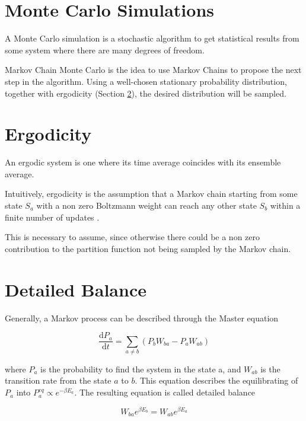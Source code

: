 \section{Monte Carlo Simulations}
\label{sec:MonteCarloSims}


A Monte Carlo simulation is a stochastic algorithm to get statistical results from some system where there are many degrees of freedom.

Markov Chain Monte Carlo is the idea to use Markov Chains to propose the next step in the algorithm. Using a well-chosen stationary probability distribution, together with ergodicity (Section \ref{sec:Ergodicity}), the desired distribution will be sampled.

\section{Ergodicity}
\label{sec:Ergodicity}

An ergodic system is one where its time average coincides with its ensemble average. 

Intuitively, ergodicity is the assumption that a Markov chain starting from some state $S_a$ with a non zero Boltzmann weight can reach any other state $S_b$ within a finite number of updates \cite{Zwanzig:nonequil_stat_mech}.

This is necessary to assume, since otherwise there could be a non zero contribution to the partition function not being sampled by the Markov chain.

\section{Detailed Balance}
\label{sec:DetailedBalance}

Generally, a Markov process can be described through the Master equation

\begin{equation}
    \frac{\mathrm d P_a}{\mathrm d t} = \sum_{a \neq b} \left ( P_b W_{ba} - P_a W_{ab} \right )
\end{equation}

where $P_a$ is the probability to find the system in the state a, and $W_{ab}$ is the transition rate from the state $a$ to $b$. This equation describes the equilibrating of $P_a$ into $P_a^{eq} \propto e^{-\beta E_a}$. The resulting equation is called detailed balance

\begin{equation}
    W_{ba} e^{\beta E_b} = W_{ab} e^{\beta E_a}
\end{equation}

